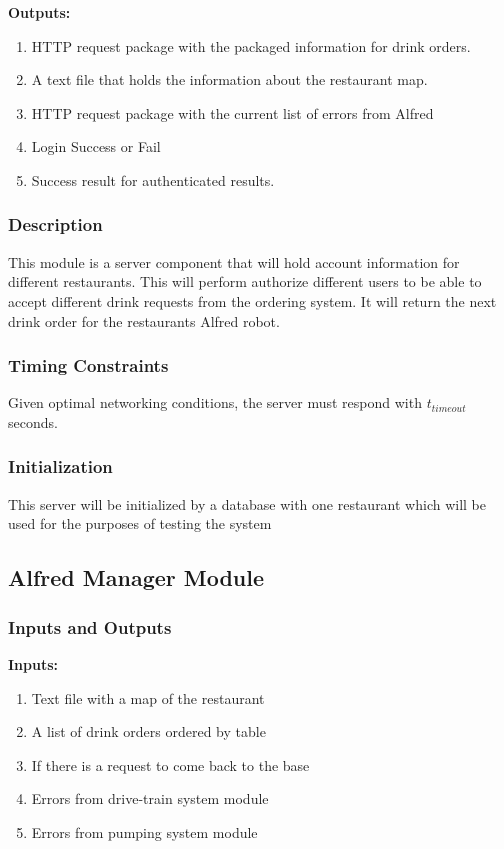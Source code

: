\documentclass [10pt]{article}
\begin{document}
\textbf{Outputs: } 
\begin{enumerate}
	\item HTTP request package with the packaged information for drink orders.
	\item A text file that holds the information about the restaurant map.
	\item HTTP request package with the current list of errors from Alfred
	\item Login Success or Fail
	\item Success result for authenticated results. 
\end{enumerate}
\subsubsection{Description}
This module is a server component that will hold account information for different restaurants. This will perform authorize different users to be able to accept different drink requests from the ordering system. It will return the next drink order for the restaurants Alfred robot.
\subsubsection{Timing Constraints}
Given optimal networking conditions, the server must respond with  $ t_{timeout} $ seconds.

\subsubsection{Initialization}
This server will be initialized by a database with one restaurant which will be used for the purposes of testing the system

\subsection{Alfred Manager Module}

\subsubsection{Inputs and Outputs}

\textbf{Inputs: } 
\begin{enumerate}
	\item Text file with a map of the restaurant
	\item A list of drink orders ordered by table
	\item If there is a request to come back to the base
	\item Errors from drive-train system module
	\item Errors from pumping system module
\end{enumerate}
\end{document}
